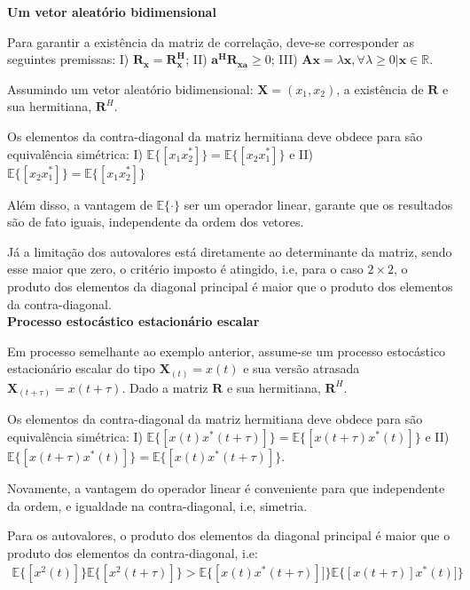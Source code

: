 \textbf{Um vetor aleatório bidimensional}

Para garantir a existência da matriz de correlação, deve-se corresponder as seguintes premissas: I) $\mathbf{R_{x}} = \mathbf{R^{H}_{x}}$; II) $\mathbf{a^{H}} \mathbf{R_{xa}} \geq 0$; III) $\mathbf{Ax} = \lambda \mathbf{x}, \forall \lambda \geq 0 | \mathbf{x} \in \mathbb{R}$.

Assumindo um vetor aleatório bidimensional: $\mathbf{X} = (x_{1},x_{2})$, a existência de $\mathbf{R}$ e sua hermitiana, $\mathbf{R}^{H}$. 

Os elementos da contra-diagonal da matriz hermitiana deve obdece para são equivalência simétrica:
I) $\mathbb{E}\{[x_{1}x^{*}_{2}]\} = \mathbb{E}\{[x_{2}x^{*}_{1}]\}$ e II) $\mathbb{E}\{[x_{2}x^{*}_{1}]\} = \mathbb{E}\{[x_{1}x^{*}_{2}]\}$

Além disso, a vantagem de $\mathbb{E}\{\cdot\}$ ser um operador linear, garante que os resultados são de fato iguais, independente da ordem dos vetores.

Já a limitação dos autovalores está diretamente ao determinante da matriz, sendo esse maior que zero, o critério imposto é atingido, i.e, para o caso $2 \times 2$, o produto dos elementos da diagonal principal é maior que o produto dos elementos da contra-diagonal.\\

\textbf{Processo estocástico estacionário escalar}

Em processo semelhante ao exemplo anterior, assume-se um processo estocástico estacionário escalar do tipo $\mathbf{X}_{(t)} = x(t)$ e sua versão atrasada $\mathbf{X}_{(t + \tau)} = x(t + \tau)$. Dado a matriz $\mathbf{R}$ e sua hermitiana, $\mathbf{R}^{H}$.

Os elementos da contra-diagonal da matriz hermitiana deve obdece para são equivalência simétrica:
I) $\mathbb{E}\{[x(t)x^{*}(t + \tau)]\} = \mathbb{E}\{[x(t + \tau)x^{*}(t)]\}$ e II) $\mathbb{E}\{[x(t + \tau)x^{*}(t)]\} = \mathbb{E}\{[x(t)x^{*}(t + \tau)]\}$.

Novamente, a vantagem do operador linear é conveniente para que independente da ordem, e igualdade na contra-diagonal, i.e, simetria.

Para os autovalores, o produto dos elementos da diagonal principal é maior que o produto dos elementos da contra-diagonal, i.e:
\begin{align*}
    \mathbb{E}\{[x^{2}(t)]\} \mathbb{E}\{[x^{2}(t + \tau)]\} > \mathbb{E}\{[x(t)x^{*}(t + \tau)]]\}  \mathbb{E}\{[x(t + \tau)]x^{*}(t)]\}
\end{align*}


